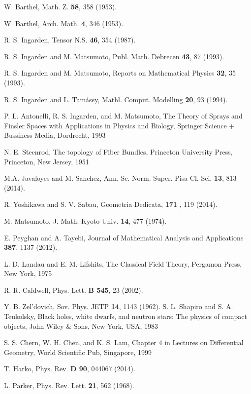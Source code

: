 \documentclass[aps,superscriptaddress, showpacs,preprintnumbers, superscriptaddress, nofootinbibt,twocolumn]{revtex4-2}
\begin{document}
\begin{thebibliography}{99}
 W. Barthel, Math. Z. \textbf{58}, 358 (1953).

 W. Barthel, Arch. Math. \textbf{4}, 346 (1953).

 R. S. Ingarden,  Tensor N.S. {\bf 46}, 354 (1987).

 R. S. Ingarden and M. Matsumoto, Publ. Math. Debrecen \textbf{%
43}, 87 (1993).

 R. S. Ingarden and M. Matsumoto, Reports on Mathematical
Physics \textbf{32}, 35 (1993).

 R. S. Ingarden and L. Tam\'{a}ssy, Mathl. Comput. Modelling
\textbf{20}, 93 (1994).

 P. L. Antonelli, R. S. Ingarden, and M. Matsumoto, The Theory
of Sprays and Finsler Spaces with Applications in Physics and Biology,
Springer Science + Bussiness Media, Dordrecht, 1993

N. E. Steenrod, The topology of Fiber Bundles, Princeton University
Press, Princeton, New Jersey, 1951

M.A. Javaloyes and M. Sanchez,  Ann. Sc. Norm.
Super. Pisa Cl. Sci.  {\bf 13},  813 (2014).

  R. Yoshikawa and S. V. Sabau, Geometria Dedicata, \textbf{171}%
, 119 (2014).

 M. Matsumoto, J. Math. Kyoto Univ. \textbf{14}, 477 (1974).

 E. Peyghan and A. Tayebi, Journal of Mathematical Analysis and
Applications \textbf{387}, 1137 (2012).

 L. D. Landau and E. M. Lifshits, The Classical Field Theory,
Pergamon Press, New York, 1975

 R. R. Caldwell, Phys. Lett. {\bf B 545}, 23 (2002).

 Y. B. Zel’dovich,  Sov. Phys. JETP
{\bf 14},  1143 (1962).
  S. L. Shapiro and S. A. Teukolsky, Black holes, white
dwarfs, and neutron stars: The physics of compact objects, John Wiley \& Sons, New York, USA, 1983

  S. S. Chern, W. H. Chen, and K. S. Lam, Chapter 4 in Lectures on Differential Geometry, World Scientific Pub, Singapore,  1999

 T. Harko, Phys. Rev. {\bf D 90}, 044067 (2014).

 L. Parker, Phys. Rev. Lett. \textbf{21}, 562 (1968).


\end{thebibliography}
\end{document}
